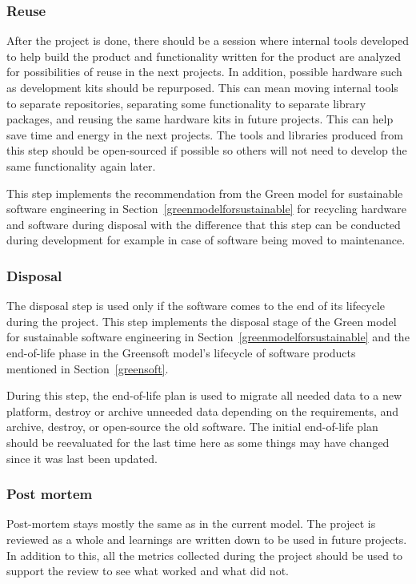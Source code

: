 \subsubsection{Reuse}
After the project is done, there should be a session where internal tools developed to help build the product and functionality written for the product are analyzed for possibilities of reuse in the next projects. In addition, possible hardware such as development kits should be repurposed. This can mean moving internal tools to separate repositories, separating some functionality to separate library packages, and reusing the same hardware kits in future projects. This can help save time and energy in the next projects. The tools and libraries produced from this step should be open-sourced if possible so others will not need to develop the same functionality again later. 

This step implements the recommendation from the Green model for sustainable software engineering in Section~\ref{greenmodelforsustainable} for recycling hardware and software during disposal with the difference that this step can be conducted during development for example in case of software being moved to maintenance.

\subsubsection{Disposal}
The disposal step is used only if the software comes to the end of its lifecycle during the project. This step implements the disposal stage of the Green model for sustainable software engineering in Section~\ref{greenmodelforsustainable} and the end-of-life phase in the Greensoft model's lifecycle of software products mentioned in Section~\ref{greensoft}.

During this step, the end-of-life plan is used to migrate all needed data to a new platform, destroy or archive unneeded data depending on the requirements, and archive, destroy, or open-source the old software. The initial end-of-life plan should be reevaluated for the last time here as some things may have changed since it was last been updated.

\subsubsection{Post mortem}
Post-mortem stays mostly the same as in the current model. The project is reviewed as a whole and learnings are written down to be used in future projects. In addition to this, all the metrics collected during the project should be used to support the review to see what worked and what did not.

